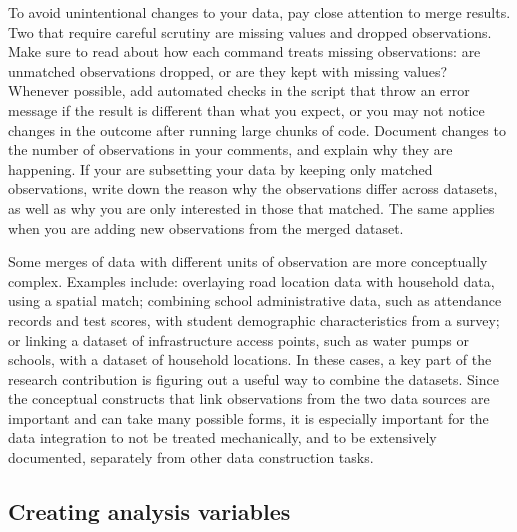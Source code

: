 To avoid unintentional changes to your data,
pay close attention to merge results.
Two that require careful scrutiny are missing values and dropped observations.
Make sure to read about how each command treats missing observations:
are unmatched observations dropped, or are they kept with missing values?
Whenever possible, add automated checks in the script that throw an error message
if the result is different than what you expect,
or you may not notice changes in the outcome after running large chunks of code.
Document changes to the number of observations in your comments,
and explain why they are happening.
If your are subsetting your data by keeping only matched observations,
write down the reason why the observations differ across datasets,
as well as why you are only interested in those that matched.
The same applies when you are adding new observations from the merged dataset.

Some merges of data with different units of observation
are more conceptually complex.
Examples include: overlaying road location data with household data,
using a spatial match; combining school administrative data, such as attendance records and test scores,
with student demographic characteristics from a survey;
or linking a dataset of infrastructure access points, such as water pumps or schools,
with a dataset of household locations.
In these cases, a key part of the research contribution is figuring out
a useful way to combine the datasets.
Since the conceptual constructs that link observations from the two data sources
are important and can take many possible forms,
it is especially important for the data integration to not be treated mechanically,
and to be extensively documented, separately from other data construction tasks.


\subsection{Creating analysis variables}

